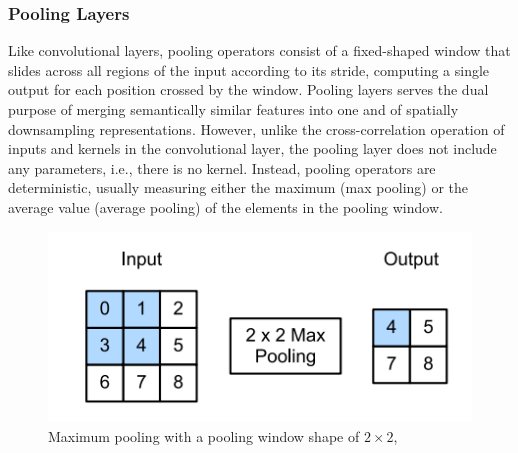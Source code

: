 \documentclass{beamer}
\begin{document}
\begin{frame}[allowframebreaks]
\frametitle{Pooling Layers}
Like convolutional layers, pooling operators consist of a fixed-shaped window that slides across all regions of the input according to its stride, computing a single output for each position crossed by the window. Pooling layers serves the dual purpose of merging semantically similar features into one and of spatially downsampling representations. However, unlike the cross-correlation operation of inputs and kernels in the convolutional layer, the pooling layer does not include any parameters, i.e., there is no kernel. Instead, pooling operators are deterministic, usually measuring either the maximum (max pooling) or the average value (average pooling) of the elements in the pooling window. 
\begin{figure}[H]
\centering
\includegraphics[scale=0.7]{png/pooling.png}
\caption{Maximum pooling with a pooling window shape of $2 \times 2$, {\cite{zhang2020dive}}}
\label{fig:pool}
\end{figure}
\end{frame}
\end{document}
